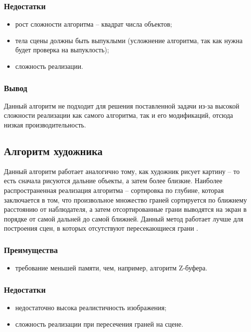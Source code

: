 \subsubsection*{Недостатки}
\begin{itemize}
	\item рост сложности алгоритма – квадрат числа объектов;
	\item тела сцены должны быть выпуклыми (усложнение алгоритма, так как нужна будет проверка на выпуклость);
	\item сложность реализации.
\end{itemize}

\subsubsection*{Вывод}
Данный алгоритм не подходит для решения поставленной задачи из-за высокой сложности реализации как самого алгоритма, так и его модификаций, отсюда низкая производительность.


\subsection{Алгоритм художника}
Данный алгоритм работает аналогично тому, как художник рисует картину – то есть сначала рисуются дальние объекты, а затем более близкие. Наиболее распространенная реализация алгоритма – сортировка по глубине, которая заключается в том, что произвольное множество граней сортируется по ближнему расстоянию от наблюдателя, а затем отсортированные грани выводятся на экран в порядке от самой дальней до самой ближней. Данный метод работает лучше для построения сцен, в которых отсутствуют пересекающиеся грани \cite{hudognik}. 

\subsubsection*{Преимущества}
\begin{itemize}
\item	требование меньшей памяти, чем, например, алгоритм Z-буфера.
\end{itemize}

\subsubsection*{Недостатки}
\begin{itemize}
\item	недостаточно высока реалистичность изображения;
\item	сложность реализации при пересечения граней на сцене.
\end{itemize}


